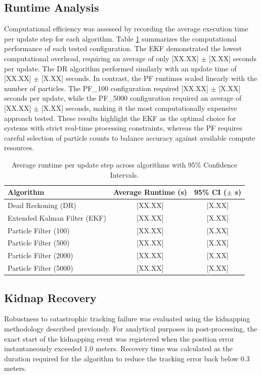 \subsection{Runtime Analysis}
Computational efficiency was assessed by recording the average execution time per update step for each algorithm. 
Table \ref{tab:runtime_analysis} summarizes the computational performance of each tested configuration. 
The EKF demonstrated the lowest computational overhead, requiring an average of only [XX.XX] $\pm$ [X.XX] seconds per update. 
The DR algorithm performed similarly with an update time of [XX.XX] $\pm$ [X.XX] seconds. 
In contrast, the PF runtimes scaled linearly with the number of particles. 
The PF\_100 configuration required [XX.XX] $\pm$ [X.XX] seconds per update, while the PF\_5000 configuration required an average of [XX.XX] $\pm$ [X.XX] seconds, making it the most computationally expensive approach tested. 
These results highlight the EKF as the optimal choice for systems with strict real-time processing constraints, whereas the PF requires careful selection of particle counts to balance accuracy against available compute resources.

\begin{table}[!htbp]
    \centering
    \caption{Average runtime per update step across algorithms with 95\% Confidence Intervals.}
    \label{tab:runtime_analysis}
    \begin{tabular}{lcc}
        \hline
        \textbf{Algorithm} & \textbf{Average Runtime (s)} & \textbf{95\% CI ($\pm$ s)} \\
        \hline
        Dead Reckoning (DR) & [XX.XX] & [X.XX] \\
        Extended Kalman Filter (EKF) & [XX.XX] & [X.XX] \\
        Particle Filter (100) & [XX.XX] & [X.XX] \\
        Particle Filter (500) & [XX.XX] & [X.XX] \\
        Particle Filter (2000) & [XX.XX] & [X.XX] \\
        Particle Filter (5000) & [XX.XX] & [X.XX] \\
        \hline
    \end{tabular}
\end{table}

\subsection{Kidnap Recovery}
Robustness to catastrophic tracking failure was evaluated using the kidnapping methodology described previously. 
For analytical purposes in post-processing, the exact start of the kidnapping event was registered when the position error instantaneously exceeded 1.0 meters. 
Recovery time was calculated as the duration required for the algorithm to reduce the tracking error back below 0.3 meters. 

